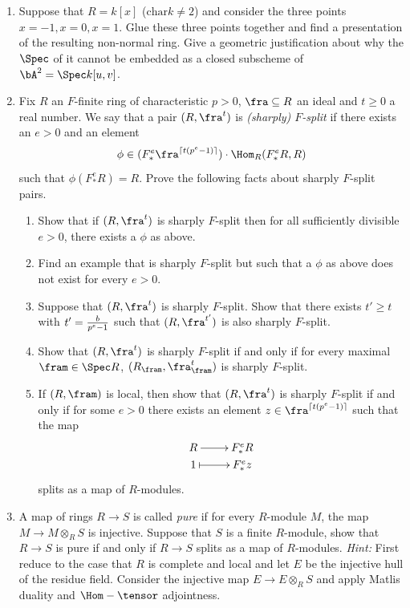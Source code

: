 \documentclass[12pt]{amsart}
\numberwithin{equation}{theorem}
\renewcommand{\:}{\colon}
\theoremstyle{theorem}
\begin{document}
\begin{enumerate}[label=(\arabic*)]
\item Suppose that $R = k[x]$ ($\mathrm{char} k \neq 2$) and consider the three points $x = -1, x = 0, x = 1$.  Glue these three points together and find a presentation of the resulting non-normal ring.  Give a geometric justification about why the $\Spec$ of it cannot be embedded as a closed subscheme of $\bA^2 = \Spec k[u,v]$.
\item Fix $R$ an $F$-finite ring of characteristic $p > 0$, $\fra \subseteq R$ an ideal and $t \geq 0$ a real number.  We say that a pair $(R, \fra^t)$ is \emph{(sharply) $F$-split} if there exists an $e > 0$ and an element
\[
\phi \in (F^e_* \fra^{\lceil t(p^e - 1) \rceil}) \cdot \Hom_R(F^e_* R, R)
\]
such that $\phi(F^e_* R) = R$.  Prove the following facts about sharply $F$-split pairs.
\begin{enumerate}
\item Show that if $(R, \fra^t)$ is sharply $F$-split then for all sufficiently divisible $e > 0$, there exists a $\phi$ as above.
\item Find an example that is sharply $F$-split but such that a $\phi$ as above does not exist for every $e > 0$.
\item Suppose that $(R, \fra^t)$ is sharply $F$-split.  Show that there exists $t' \geq t$ with $t' = {b \over p^e - 1}$ such that $(R, \fra^{t'})$ is also sharply $F$-split.
\item Show that $(R, \fra^t)$ is sharply $F$-split if and only if for every maximal $\fram \in \Spec R$, $(R_{\fram}, \fra_{\fram}^t)$ is sharply $F$-split.
\item If $(R, \fram)$ is local, then show that $(R, \fra^t)$ is sharply $F$-split if and only if for some $e > 0$ there exists an element $z \in \fra^{\lceil t(p^e - 1)\rceil}$ such that the map
\[
\xymatrix@R=0pt{
R \ar[r] & F^e_* R \\
1 \ar@{|->}[r] & F^e_* z \\
}
\]
splits as a map of $R$-modules.
\end{enumerate}
\item A map of rings $R \to S$ is called \emph{pure} if for every $R$-module $M$, the map $M \to M \otimes_R S$ is injective.  Suppose that $S$ is a finite $R$-module, show that $R \to S$ is pure if and only if $R \to S$ splits as a map of $R$-modules.
    \vskip 3pt
    \emph{Hint:} First reduce to the case that $R$ is complete and local and let $E$ be the injective hull of the residue field.  Consider the injective map $E \to E \otimes_R S$ and apply Matlis duality and $\Hom-\tensor$ adjointness.

\end{enumerate}
\end{document}
